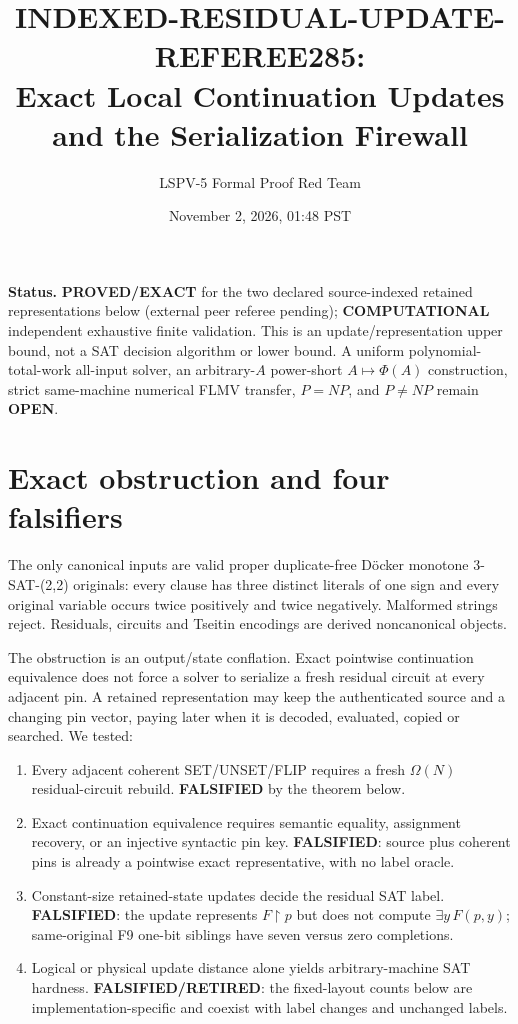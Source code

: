 \documentclass[11pt]{article}
\title{INDEXED-RESIDUAL-UPDATE-REFEREE285:\\Exact Local Continuation Updates and the Serialization Firewall}
\author{LSPV-5 Formal Proof Red Team}
\date{November 2, 2026, 01:48 PST}
\begin{document}
\maketitle

\noindent\textbf{Status.} \textbf{PROVED/EXACT} for the two declared source-indexed retained representations below (external peer referee pending); \textbf{COMPUTATIONAL} independent exhaustive finite validation. This is an update/representation upper bound, not a SAT decision algorithm or lower bound. A uniform polynomial-total-work all-input solver, an arbitrary-$A$ power-short $A\mapsto\Phi(A)$ construction, strict same-machine numerical FLMV transfer, $P=NP$, and $P\ne NP$ remain \textbf{OPEN}.

\section{Exact obstruction and four falsifiers}
The only canonical inputs are valid proper duplicate-free D\"ocker monotone 3-SAT-(2,2) originals: every clause has three distinct literals of one sign and every original variable occurs twice positively and twice negatively. Malformed strings reject. Residuals, circuits and Tseitin encodings are derived noncanonical objects.

The obstruction is an output/state conflation. Exact pointwise continuation equivalence does not force a solver to serialize a fresh residual circuit at every adjacent pin. A retained representation may keep the authenticated source and a changing pin vector, paying later when it is decoded, evaluated, copied or searched. We tested:
\begin{enumerate}
\item[(H1)] Every adjacent coherent SET/UNSET/FLIP requires a fresh $\Omega(N)$ residual-circuit rebuild. \textbf{FALSIFIED} by the theorem below.
\item[(H2)] Exact continuation equivalence requires semantic equality, assignment recovery, or an injective syntactic pin key. \textbf{FALSIFIED}: source plus coherent pins is already a pointwise exact representative, with no label oracle.
\item[(H3)] Constant-size retained-state updates decide the residual SAT label. \textbf{FALSIFIED}: the update represents $F\!\upharpoonright p$ but does not compute $\exists y\,F(p,y)$; same-original F9 one-bit siblings have seven versus zero completions.
\item[(H4)] Logical or physical update distance alone yields arbitrary-machine SAT hardness. \textbf{FALSIFIED/RETIRED}: the fixed-layout counts below are implementation-specific and coexist with label changes and unchanged labels.
\end{enumerate}
\end{document}

